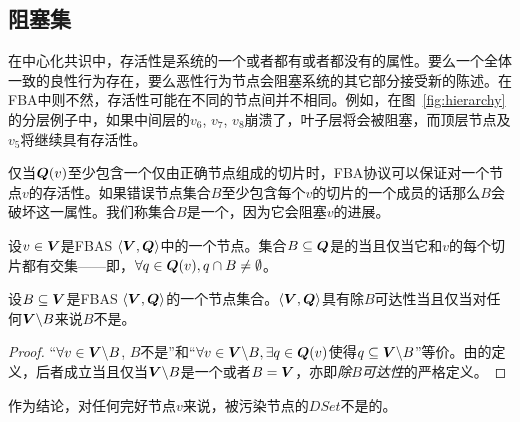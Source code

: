 \subsection{阻塞集}
在中心化共识中，存活性是系统的一个或者都有或者都没有的属性。要么一个全体一致的良性行为{\quorum}存在，要么恶性行为节点会阻塞系统的其它部分接受新的陈述。在FBA中则不然，存活性可能在不同的节点间并不相同。例如，在图~\ref{fig:hierarchy}的分层{\quorum}例子中，如果中间层的$v_6$, $v_7$, $v_8$崩溃了，叶子层将会被阻塞，而顶层节点及$v_5$将继续具有存活性。

仅当${\bm Q}(v)$至少包含一个仅由正确节点组成的{\quorum}切片时，FBA协议可以保证对一个节点$v$的存活性。如果错误节点集合$B$至少包含每个$v$的切片的一个成员的话那么$B$会破坏这一属性。我们称集合$B$是一个{\vblock}，因为它会阻塞$v$的进展。

\begin{definition}[{\vblock}]
        设$v\in {\bm V}$是FBAS $\langle{\bm V},{\bm Q}\rangle$中的一个节点。集合$B\subseteq {\bm Q}$是{\vblock}的当且仅当它和$v$的每个切片都有交集——即，$\forall q\in {\bm Q}(v),q\cap B\neq \emptyset$。
\end{definition}

\begin{theorem}\label{thm:quorum_availability_vs_vblocking}
        设$B\subseteq {\bm V}$是FBAS $\langle{\bm V},{\bm Q}\rangle$的一个节点集合。$\langle{\bm V},{\bm Q}\rangle$具有除$B${\quorum}可达性当且仅当对任何${\bm V}\backslash B$来说$B$不是{\vblock}。
\end{theorem}

\begin{proof}
        ``$\forall v\in {\bm V}\backslash B$, $B$不是{\vblock}''和``$\forall v\in{\bm V}\backslash B, \exists q\in {\bm Q}(v)$使得$q\subseteq {\bm V}\backslash B$''等价。由{\quorum}的定义，后者成立当且仅当${\bm V}\backslash B$是一个{\quorum}或者$B={\bm V}$，亦即\textit{除$B${\quorum}可达性}的严格定义。
\end{proof}

作为结论，对任何完好节点$v$来说，被污染节点的$DSet$不是{\vblock}的。
